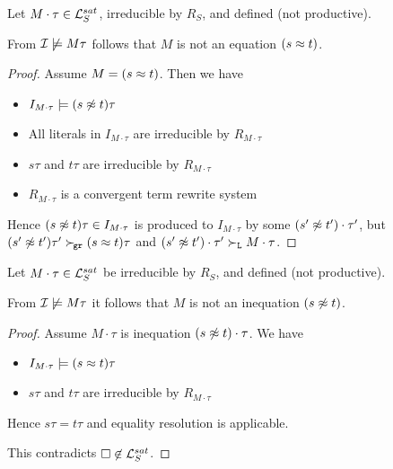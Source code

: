        \begin{lemma}\label{equation}
            Let \( M\cdot\tau\in\mathcal{L}_S^{sat} \),
            irreducible by \( R_S \), and defined (not productive).

            From \( \mathcal{I}\not\models M\tau \) follows that \( M \) is not an equation \( (s\approx t) \).

       \begin{proof}
            Assume \( M = (s\approx t) \). Then we have
           \begin{itemize}
               \item \( I_{M\cdot\tau}\models (s\not\approx t)\tau \)
               \item All literals in \( I_{M\cdot\tau} \) are irreducible by \( R_{M\cdot\tau} \)
               \item \( s\tau \) and \( t\tau \) are irreducible by \( R_{M\cdot\tau} \)
               \item \( R_{M\cdot\tau} \) is a convergent term rewrite system
           \end{itemize}
            Hence \( (s\not\approx t)\tau\in I_{M\cdot\tau} \)
            is produced to \( I_{M\cdot\tau} \) by some \( (s'\not\approx t')\cdot\tau' \),
% 
            but \( (s'\not\approx t')\tau'\mathrel\succ_{\!\mathtt{gr}} (s\approx t)\tau \)
            and \( (s'\not\approx t')\cdot\tau'\mathrel\succ_{\mathtt{L}} M\cdot\tau \).
           \hfill

       \end{proof}
       \end{lemma}


       \begin{lemma}\label{inequation}
            Let \( M\cdot\tau\in\mathcal{L}_S^{sat} \) be
            irreducible by \( R_S \), and defined (not productive).

            From \( \mathcal{I}\not\models M\tau \) it follows that \( M \) is not an inequation \( (s\not\approx t) \).
           \begin{proof}
            Assume \( M\cdot\tau \) is inequation \( (s\not\approx t)\cdot\tau \). We have
           \begin{itemize}
               \item \( I_{M\cdot\tau}\models (s\approx t)\tau \)
               \item \( s\tau \) and \( t\tau \) are irreducible by \( R_{M\cdot\tau} \)
           \end{itemize}
            Hence \( s\tau = t\tau \) and equality resolution is applicable.

            This contradicts \( \square\not\in\mathcal{L}_S^{sat} \).
           \hfill

       \end{proof}
       \end{lemma}




